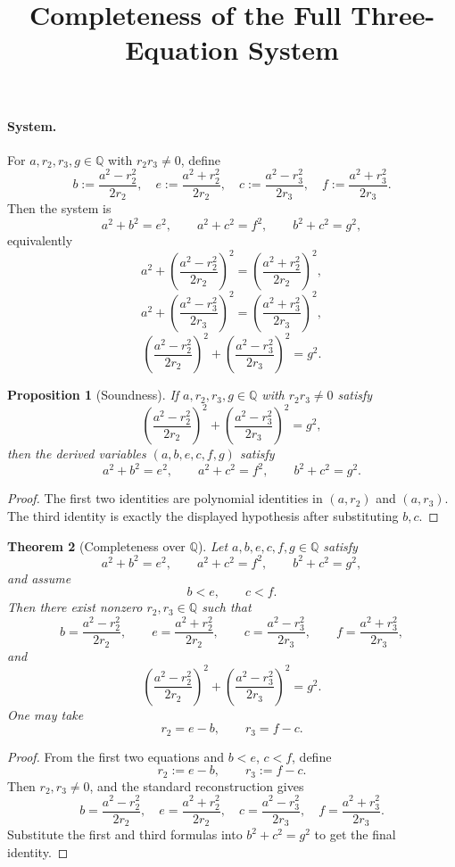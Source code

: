 \documentclass[11pt]{article}
\newtheorem{theorem}{Theorem}
\newtheorem{proposition}[theorem]{Proposition}
\begin{document}
\title{Completeness of the Full Three-Equation System}
\author{}
\date{}
\maketitle

\paragraph{System.}
For $a,r_2,r_3,g\in\mathbb{Q}$ with $r_2r_3\neq 0$, define
\[
b:=\frac{a^2-r_2^2}{2r_2},\quad
e:=\frac{a^2+r_2^2}{2r_2},\quad
c:=\frac{a^2-r_3^2}{2r_3},\quad
f:=\frac{a^2+r_3^2}{2r_3}.
\]
Then the system is
\[
a^2+b^2=e^2,\qquad
a^2+c^2=f^2,\qquad
b^2+c^2=g^2,
\]
equivalently
\[
a^2+\left(\frac{a^2-r_2^2}{2r_2}\right)^2
=
\left(\frac{a^2+r_2^2}{2r_2}\right)^2,
\]
\[
a^2+\left(\frac{a^2-r_3^2}{2r_3}\right)^2
=
\left(\frac{a^2+r_3^2}{2r_3}\right)^2,
\]
\[
\left(\frac{a^2-r_2^2}{2r_2}\right)^2
+
\left(\frac{a^2-r_3^2}{2r_3}\right)^2
=
g^2.
\]

\begin{proposition}[Soundness]
If $a,r_2,r_3,g\in\mathbb{Q}$ with $r_2r_3\neq 0$ satisfy
\[
\left(\frac{a^2-r_2^2}{2r_2}\right)^2
+
\left(\frac{a^2-r_3^2}{2r_3}\right)^2
=
g^2,
\]
then the derived variables $(a,b,e,c,f,g)$ satisfy
\[
a^2+b^2=e^2,\qquad
a^2+c^2=f^2,\qquad
b^2+c^2=g^2.
\]
\end{proposition}

\begin{proof}
The first two identities are polynomial identities in $(a,r_2)$ and $(a,r_3)$.
The third identity is exactly the displayed hypothesis after substituting $b,c$.
\end{proof}

\begin{theorem}[Completeness over $\mathbb{Q}$]
Let $a,b,e,c,f,g\in\mathbb{Q}$ satisfy
\[
a^2+b^2=e^2,\qquad
a^2+c^2=f^2,\qquad
b^2+c^2=g^2,
\]
and assume
\[
b<e,\qquad c<f.
\]
Then there exist nonzero $r_2,r_3\in\mathbb{Q}$ such that
\[
b=\frac{a^2-r_2^2}{2r_2},\qquad
e=\frac{a^2+r_2^2}{2r_2},\qquad
c=\frac{a^2-r_3^2}{2r_3},\qquad
f=\frac{a^2+r_3^2}{2r_3},
\]
and
\[
\left(\frac{a^2-r_2^2}{2r_2}\right)^2
+
\left(\frac{a^2-r_3^2}{2r_3}\right)^2
=
g^2.
\]
One may take
\[
r_2=e-b,\qquad r_3=f-c.
\]
\end{theorem}

\begin{proof}
From the first two equations and $b<e$, $c<f$, define
\[
r_2:=e-b,\qquad r_3:=f-c.
\]
Then $r_2,r_3\neq 0$, and the standard reconstruction gives
\[
b=\frac{a^2-r_2^2}{2r_2},\quad
e=\frac{a^2+r_2^2}{2r_2},\quad
c=\frac{a^2-r_3^2}{2r_3},\quad
f=\frac{a^2+r_3^2}{2r_3}.
\]
Substitute the first and third formulas into $b^2+c^2=g^2$ to get the final identity.
\end{proof}
\end{document}
